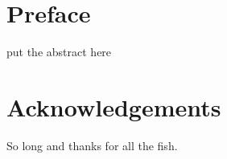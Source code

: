 \documentclass
[
  a4paper,
  12pt,
  oneside,
  openright,
  chapterprefix,
  bibtotoc,
  idxtotoc,
] {scrbook} %
\begin{document}
\frontmatter


\chapter{Preface}
\thispagestyle{empty}
put the abstract here
\clearpage


\chapter{Acknowledgements}
\thispagestyle{empty}
So long and thanks for all the fish.
\clearpage


\newpage
\tableofcontents
\thispagestyle{empty}
\clearpage

\listoffigures      %
\thispagestyle{empty}
\clearpage

\mainmatter









\appendix
\def\chaptername{Appendix}
%
%



\renewcommand{\bibname}{List of References}




\printindex



\end{document}
